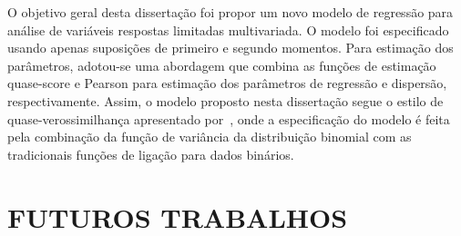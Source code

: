 
O objetivo geral desta dissertação foi propor um novo modelo de
regressão para análise de variáveis respostas limitadas multivariada. O
modelo foi especificado usando apenas suposições de primeiro e segundo
momentos. Para estimação dos parâmetros, adotou-se uma abordagem que
combina as funções de estimação quase-score e Pearson para estimação dos
parâmetros de regressão e dispersão, respectivamente. Assim, o modelo
proposto nesta dissertação segue o estilo de quase-verossimilhança
apresentado por~, onde a especificação do
modelo é feita pela combinação da função de variância da distribuição
binomial com as tradicionais funções de ligação para dados binários.

\section{FUTUROS TRABALHOS}

